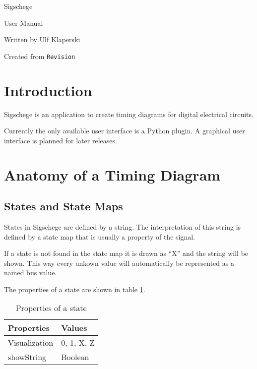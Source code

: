 \documentclass[11pt]{article}
\begin{document}
\begin{center}
\Huge Sigschege

\vspace{1cm}

\LARGE User Manual

\vspace{3cm}

Written by Ulf Klaperski

\vspace{1cm}

Created from \verb$Revision$
  
\end{center}

\eject

\section{Introduction}
\label{sec:intro}

Sigschege is an application to create timing diagrams for digital electrical circuits.

Currently the only available user interface is a Python plugin. A graphical user
interface is planned for later releases.

\section{Anatomy of a Timing Diagram}
\label{sec:anatomy}

\subsection{States and State Maps}
\label{subsec:statemap}

States in Sigschege are defined by a string. The interpretation of this string
is defined by a state map that is usually a property of the signal.  

If a state is not found in the state map it is drawn as ``X'' and the string
will be shown. This way every unkown value will automatically be represented as
a named bus value.

The properties of a state are shown in table \ref{tab:statemap}.

\begin{table}[htbp]
  \centering
  \begin{tabular}[l]{l|l}
    \textbf{Properties}&\textbf{Values}\\\hline
    Visualization&0, 1, X, Z\\
    showString&Boolean\\\hline
  \end{tabular}
  \caption{Properties of a state}
  \label{tab:statemap}
\end{table}
\end{document}
